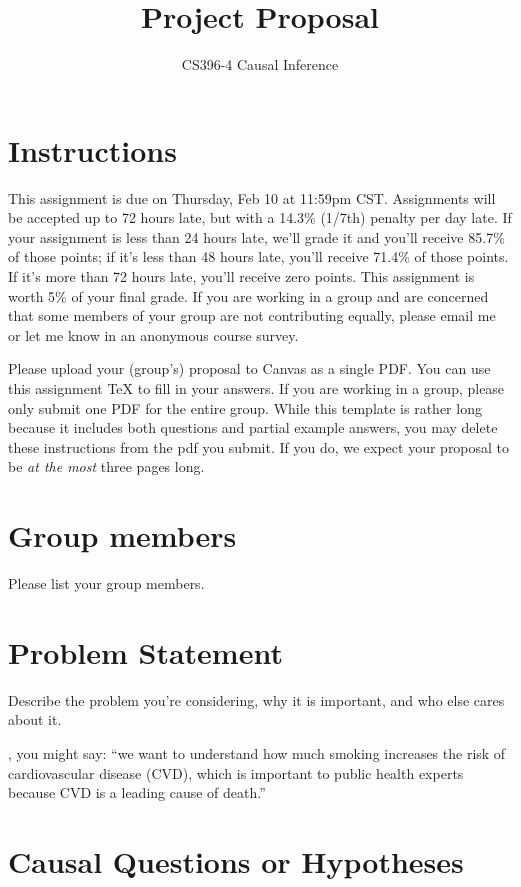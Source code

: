 \documentclass[12pt]{article}
\title{Project Proposal \vspace{-1em}}
\author{CS396-4 Causal Inference}
\begin{document}
\maketitle

\section*{Instructions}

This assignment is due on Thursday, Feb 10 at 11:59pm CST. Assignments will be accepted up to 72 hours late, but with a 14.3\% (1/7th) penalty per day late. If your assignment is less than 24 hours late, we’ll grade it and you’ll receive 85.7\% of those points; if it’s less than 48 hours late, you’ll receive 71.4\% of those points. If it’s more than 72 hours late, you'll receive zero points. This assignment is worth 5\% of your final grade. If you are working in a group and are concerned that some members of your group are not contributing equally, please email me or let me know in an anonymous course survey.

Please upload your (group's) proposal to Canvas as a single PDF. You can use this assignment TeX to fill in your answers. If you are working in a group, please only submit one PDF for the entire group. While this template is rather long because it includes both questions and partial example answers, you may delete these instructions from the pdf you submit. If you do, we expect your proposal to be \emph{at the most} three pages long.

\section{Group members}

\noindent Please list your group members.

\section{Problem Statement}

\noindent Describe the problem you're considering, why it is important, and who else cares about it.

, you might say: ``we want to understand how much smoking increases the risk of cardiovascular disease (CVD), which is important to public health experts because CVD is a leading cause of death.''

\section{Causal Questions or Hypotheses}
\end{document}
